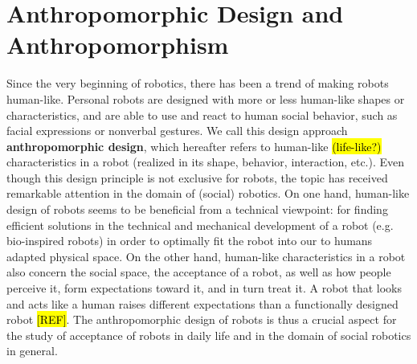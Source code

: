 \documentclass[twocolumn]{svjour3}          %
\begin{document}
%
%
%
%
%
%


\section{Anthropomorphic Design and Anthropomorphism}
\label{intro}

	 Since the very beginning of robotics, there has been a trend of making robots human-like. Personal robots are designed with more or less human-like shapes or characteristics, and are able to use and react to human social behavior, such as facial expressions or nonverbal gestures. We call this design approach \textbf{anthropomorphic design}, which hereafter refers to human-like \hl{(life-like?)} characteristics in a robot (realized in its shape, behavior, interaction, etc.). Even though this design principle is not exclusive for robots, the topic has received remarkable attention in the domain of (social) robotics. On one hand, human-like design of robots seems to be beneficial from a technical viewpoint: for finding efficient solutions in the technical and mechanical development of a robot (e.g. bio-inspired robots) in order to optimally fit the robot into our to humans adapted physical space. On the other hand, human-like characteristics in a robot also concern the social space, the acceptance of a robot, as well as how people perceive it, form expectations toward it, and in turn treat it. A robot that looks and acts like a human raises different expectations than a functionally designed robot \hl{[REF]}. The anthropomorphic design of robots is thus a crucial aspect for the study of acceptance of robots in daily life and in the domain of social robotics in general. 
	
\end{document}
